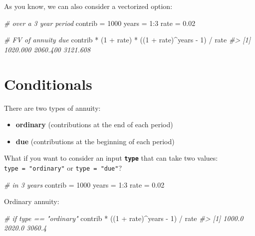 \documentclass[
]{book}
\newenvironment{Shaded}{\begin{snugshade}}{\end{snugshade}}
\newcommand{\CommentTok}[1]{\textcolor[rgb]{0.56,0.35,0.01}{\textit{#1}}}
\newcommand{\DecValTok}[1]{\textcolor[rgb]{0.00,0.00,0.81}{#1}}
\newcommand{\FloatTok}[1]{\textcolor[rgb]{0.00,0.00,0.81}{#1}}
\newcommand{\NormalTok}[1]{#1}
\newcommand{\OtherTok}[1]{\textcolor[rgb]{0.56,0.35,0.01}{#1}}
\newcommand{\SpecialCharTok}[1]{\textcolor[rgb]{0.00,0.00,0.00}{#1}}
\begin{document}
As you know, we can also consider a vectorized option:

\begin{Shaded}
\begin{Highlighting}[]
\CommentTok{\# over a 3 year period}
\NormalTok{contrib }\OtherTok{=} \DecValTok{1000}
\NormalTok{years }\OtherTok{=} \DecValTok{1}\SpecialCharTok{:}\DecValTok{3}
\NormalTok{rate }\OtherTok{=} \FloatTok{0.02}

\CommentTok{\# FV of annuity due}
\NormalTok{contrib }\SpecialCharTok{*}\NormalTok{ (}\DecValTok{1} \SpecialCharTok{+}\NormalTok{ rate) }\SpecialCharTok{*}\NormalTok{ ((}\DecValTok{1} \SpecialCharTok{+}\NormalTok{ rate)}\SpecialCharTok{\^{}}\NormalTok{years }\SpecialCharTok{{-}} \DecValTok{1}\NormalTok{) }\SpecialCharTok{/}\NormalTok{ rate}
\CommentTok{\#\textgreater{} [1] 1020.000 2060.400 3121.608}
\end{Highlighting}
\end{Shaded}

\hypertarget{conditionals-1}{%
\section{Conditionals}\label{conditionals-1}}

There are two types of annuity:

\begin{itemize}
\item
  \textbf{ordinary} (contributions at the end of each period)
\item
  \textbf{due} (contributions at the beginning of each period)
\end{itemize}

What if you want to consider an input \textbf{\texttt{type}} that can take
two values: \texttt{type\ =\ "ordinary"} or \texttt{type\ =\ "due"}?

\begin{Shaded}
\begin{Highlighting}[]
\CommentTok{\# in 3 years}
\NormalTok{contrib }\OtherTok{=} \DecValTok{1000}
\NormalTok{years }\OtherTok{=} \DecValTok{1}\SpecialCharTok{:}\DecValTok{3}
\NormalTok{rate }\OtherTok{=} \FloatTok{0.02}
\end{Highlighting}
\end{Shaded}

Ordinary annuity:

\begin{Shaded}
\begin{Highlighting}[]
\CommentTok{\# if type == "ordinary"}
\NormalTok{contrib }\SpecialCharTok{*}\NormalTok{ ((}\DecValTok{1} \SpecialCharTok{+}\NormalTok{ rate)}\SpecialCharTok{\^{}}\NormalTok{years }\SpecialCharTok{{-}} \DecValTok{1}\NormalTok{) }\SpecialCharTok{/}\NormalTok{ rate}
\CommentTok{\#\textgreater{} [1] 1000.0 2020.0 3060.4}
\end{Highlighting}
\end{Shaded}
\end{document}
